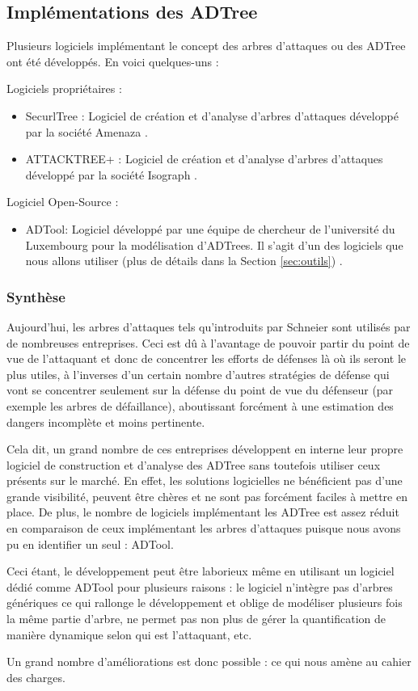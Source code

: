 	\subsection{Implémentations des ADTree}
		Plusieurs logiciels implémentant le concept des arbres d'attaques ou des ADTree ont été développés. En voici quelques-uns :
        
        Logiciels propriétaires :
        \begin{itemize}
        \item SecurlTree : Logiciel de création et d'analyse d'arbres d'attaques développé par la société Amenaza \cite{SecurlTree}.
        \item ATTACKTREE+ : Logiciel de création et d'analyse d'arbres d'attaques développé par la société Isograph \cite{ATTACKTREE+}.
        \end{itemize}
        
        Logiciel Open-Source :
        \begin{itemize}
        \item ADTool: Logiciel développé par une équipe de chercheur de l'université du Luxembourg pour la modélisation d'ADTrees. Il s'agit d'un des logiciels que nous allons utiliser (plus de détails dans la Section \ref{sec:outils}) \cite{ADTool}.
        \end{itemize}

        \subsubsection{Synthèse}
            Aujourd'hui, les arbres d'attaques tels qu'introduits par Schneier sont utilisés par de nombreuses entreprises. Ceci est dû à l'avantage de pouvoir partir du point de vue de l'attaquant et donc de concentrer les efforts de défenses là où ils seront le plus utiles, à l'inverses d'un certain nombre d'autres stratégies de défense qui vont se concentrer seulement sur la défense du point de vue du défenseur (par exemple les arbres de défaillance), aboutissant forcément à une estimation des dangers incomplète et moins pertinente. 

            Cela dit, un grand nombre de ces entreprises développent en interne leur propre logiciel de construction et d'analyse des ADTree sans toutefois utiliser ceux présents sur le marché. En effet, les solutions logicielles ne bénéficient pas d'une grande visibilité, peuvent être chères et ne sont pas forcément faciles à mettre en place. De plus, le nombre de logiciels implémentant les ADTree est assez réduit en comparaison de ceux implémentant les arbres d'attaques puisque nous avons pu en identifier un seul : ADTool. 

            Ceci étant, le développement peut être laborieux même en utilisant un logiciel dédié comme ADTool pour plusieurs raisons : le logiciel n’intègre pas d'arbres génériques ce qui rallonge le développement et oblige de modéliser plusieurs fois la même partie d'arbre, ne permet pas non plus de gérer la quantification de manière dynamique selon qui est l'attaquant, etc.

            Un grand nombre d'améliorations est donc possible : ce qui nous amène au cahier des charges.
